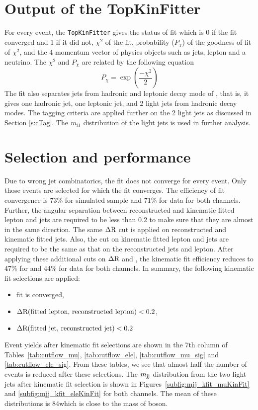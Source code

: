 \section{Output of the TopKinFitter}
\label{ss:outputKF} 
For every event, the \verb|TopKinFitter| gives the status of fit which is 0 if 
the fit converged and 1 if it did not, $\chi^2$ of the fit, probability ($P_{\chi}$) 
of the goodness-of-fit of $\chi^2$, and the 4 momentum vector of physics objects such
as jets, lepton and a neutrino. The $\chi^2$ and $P_{\chi}$ are related by the 
following equation
\begin{equation}
	P_{\chi} = \exp(\frac{-\chi^2}{2})
\end{equation}
The fit also separates jets from hadronic and leptonic decay mode of \ttbar, 
that is, it gives one hadronic \PQb jet, one leptonic \PQb jet, and 2 light jets from hadronic
decay modes. The \PQc tagging criteria are applied further on the 2 light jets as 
discussed in Section \ref{s:cTag}. The $\mjj$ distribution of the light jets is used in 
further analysis.

\section{Selection and performance}
\label{ss:selKF} 
Due to wrong jet combinatorics, the fit does not converge for every event. Only 
those events are selected for which the fit converges. The efficiency of fit convergence 
is 73\% for simulated \ttbar sample and 71\% for data for both channels.
Further, the angular separation between reconstructed and kinematic fitted 
lepton and jets are required to be less than 0.2 to make sure that they are almost in the same
direction. The same $\Delta \rm R$ cut is applied on reconstructed and kinematic
fitted jets. Also, the \pt cut on kinematic fitted lepton and jets are required to
be the same as that on the reconstructed jets and lepton. After applying these additional 
cuts on $\Delta \rm R$ and \pt, the kinematic fit efficiency reduces to 47\% for \ttbar 
and 44\% for data for both channels. In summary, the following kinematic fit selections are applied: 
\begin{itemize}[leftmargin=*]
 \item fit is converged,
 \item $\Delta \rm R (\text{fitted lepton, reconstructed lepton}) < 0.2$,
 \item $\Delta \rm R (\text{fitted jet, reconstructed jet}) < 0.2$%
\end{itemize}
Event yields after kinematic fit selections are shown in the 7th column of Tables~\ref{tab:cutflow_mu},
\ref{tab:cutflow_ele}, \ref{tab:cutflow_mu_sig} and \ref{tab:cutflow_ele_sig}.
From these tables, we see that almost half the number of events is reduced after these selections. 
The $\mjj$ distribution from the two light jets after kinematic fit selection is shown in 
Figures~\ref{subfig:mjj_kfit_muKinFit} and \ref{subfig:mjj_kfit_eleKinFit} for both channels. 
The mean of these distributions is 84\GeV which is close to the mass of \PW boson. 

